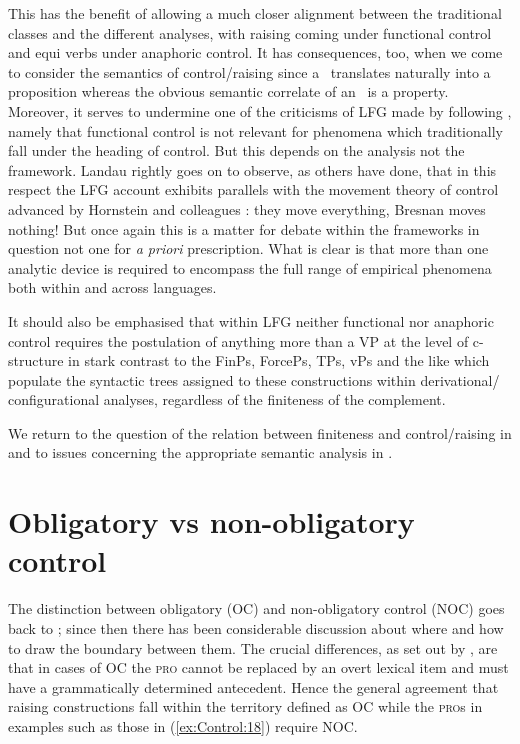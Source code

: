 \documentclass[output=paper,hidelinks]{langscibook}
\begin{document}
\ea\label{ex:Control:17}
\z
This has the benefit of allowing a much closer alignment between the traditional classes and the different analyses, with raising coming under functional control and equi verbs under anaphoric control. It has consequences, too, when we come to consider the semantics of control/raising since a \COMP\ translates naturally into a proposition whereas the obvious semantic correlate of an \XCOMP\ is a property. Moreover, it serves to undermine one of the criticisms of LFG made by \citet[61--62]{Landau2013} following \citet{Davies1988}, namely that functional control is not relevant for phenomena which traditionally fall under the heading of control. But this depends on the analysis not the framework. Landau rightly goes on to observe, as others have done, that in this respect the LFG account exhibits parallels with the movement theory of control advanced by Hornstein and colleagues \citep{Hornstein1999,hornpoli10}: they move everything, Bresnan moves nothing! But once again this is a matter for debate within the frameworks in question not one for \emph{a priori} prescription. What is clear is that more than one analytic device is required to encompass the full range of empirical phenomena both within and across languages.

It should also be emphasised that within LFG neither functional nor anaphoric control requires the postulation of anything more than a VP at the level of c-structure in stark contrast to the FinPs, ForcePs, TPs, vPs and the like which populate the syntactic trees assigned to these constructions within derivational/ configurational analyses, regardless of the finiteness of the complement.

 We return to the question of the relation between finiteness and control/raising in  and to issues concerning the appropriate semantic analysis in .

\section{Obligatory vs non-obligatory control}
\label{sec:Control:3}

The distinction between obligatory (OC) and non-obligatory control (NOC) goes back to \citet{Williams1980}; since then there has been considerable discussion about where and how to draw the boundary between them. The crucial differences, as set out by \citet[208--209]{Williams1980}, are that in cases of OC the \textsc{pro} cannot be replaced by an overt lexical item and must have a grammatically determined antecedent. Hence the general agreement that raising constructions fall within the territory defined as OC while the \textsc{pro}s in examples such as those in (\ref{ex:Control:18}) require NOC.
\end{document}
